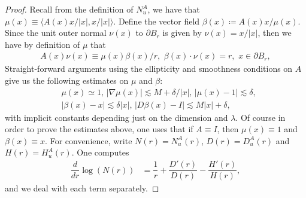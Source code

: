 \documentclass[10pt,a4paper]{amsart}
\newcommand{\abs}[1]{\left \lvert #1 \right \rvert}
\begin{document}
	\begin{proof}
		Recall from the definition of $N_u^A$, we have that $\mu(x) \equiv \langle A(x)x/\abs{x}, x/\abs{x}\rangle$. Define the vector field $\beta(x) \coloneqq A(x)x/\mu(x)$. Since the unit outer normal $\nu(x)$ to $\partial B_r$ is given by $\nu(x) = x/\abs{x}$, then we have by definition of $\mu$ that
		\begin{align}
			A(x) \nu(x) \equiv \mu(x) \beta(x)/r, \, \,  \beta(x) \cdot \nu(x) = r, \, \, x \in \partial B_r,  \label{eqn:beta_norm}
		\end{align}
		Straight-forward arguments using the ellipticity and smoothness conditions on $A$ give us the following estimates on $\mu$ and $\beta$:
		\begin{align}
			& \mu(x)  \simeq 1, \, \abs{\nabla \mu(x)} \lesssim M + \delta/\abs{x}, \, \abs{\mu(x)  -1} \lesssim \delta, \label{eqn:mu_est} \\
			& \abs{\beta(x) - x} \lesssim \delta \abs{x}, \, \abs{D\beta(x) - I} \lesssim  M \abs{x}  + \delta, \label{eqn:beta_est}
		\end{align}
		with implicit constants depending just on the dimension and $\lambda$. Of course in order to prove the estimates above, one uses that if $A \equiv I$, then $\mu(x) \equiv 1$ and $\beta(x) \equiv x$. 
		For convenience, write $N(r) = N_u^A(r)$, $D(r) = D_u^A(r)$ and $H(r) = H_u^A(r)$. One computes
		\begin{align}\label{eqn:logN'}
			\dfrac{d}{dr} \log(N(r)) & = \dfrac{1}{r}  + \dfrac{D'(r)}{D(r)} - \dfrac{H'(r)}{H(r)},
		\end{align}
		and we deal with each term separately.
		

\end{proof}
\end{document}
